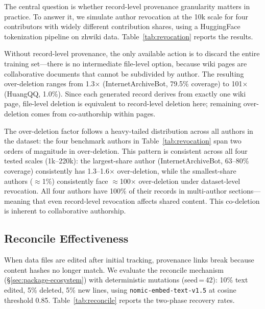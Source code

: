 The central question is whether record-level provenance granularity matters in practice. To answer it, we simulate author revocation at the 10k scale for four contributors with widely different contribution shares, using a HuggingFace tokenization pipeline on zhwiki data. Table~\ref{tab:revocation} reports the results.



Without record-level provenance, the only available action is to discard the entire training set---there is no intermediate file-level option, because wiki pages are collaborative documents that cannot be subdivided by author. The resulting over-deletion ranges from 1.3$\times$ (InternetArchiveBot, 79.5\% coverage) to 101$\times$ (HuangQQ, 1.0\%). Since each generated record derives from exactly one wiki page, file-level deletion is equivalent to record-level deletion here; remaining over-deletion comes from co-authorship within pages.

The over-deletion factor follows a heavy-tailed distribution across all authors in the dataset: the four benchmark authors in Table~\ref{tab:revocation} span two orders of magnitude in over-deletion. This pattern is consistent across all four tested scales (1k--220k): the largest-share author (InternetArchiveBot, 63--80\% coverage) consistently has 1.3--1.6$\times$ over-deletion, while the smallest-share authors ($\approx$1\%) consistently face $\approx$100$\times$ over-deletion under dataset-level revocation. All four authors have 100\% of their records in multi-author sections---meaning that even record-level revocation affects shared content. This co-deletion is inherent to collaborative authorship.

\subsection{Reconcile Effectiveness}
\label{sec:reconcile-effectiveness}

When data files are edited after initial tracking, provenance links break because content hashes no longer match. We evaluate the reconcile mechanism (\S\ref{sec:package-ecosystem}) with deterministic mutations (seed\,=\,42): 10\% text edited, 5\% deleted, 5\% new lines, using \texttt{nomic-embed-text-v1.5} at cosine threshold 0.85. Table~\ref{tab:reconcile} reports the two-phase recovery rates.



